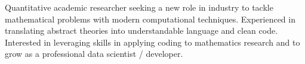 \documentclass[letter,10pt]{article}
\begin{document}


Quantitative academic researcher seeking a new role in industry to tackle mathematical problems with modern computational techniques. Experienced in translating abstract theories into understandable language and clean code. Interested in leveraging skills in applying coding to mathematics research and to grow as a professional data scientist / developer.
\end{document}
